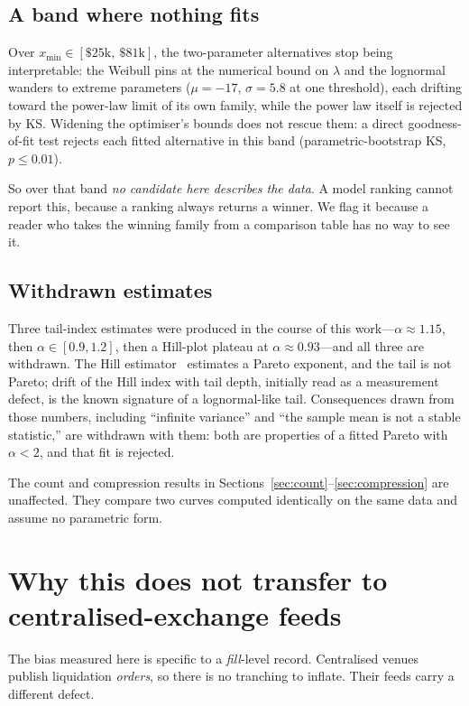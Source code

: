 \documentclass[11pt,a4paper]{article}
\begin{document}
\subsection{A band where nothing fits}

Over $x_{\min} \in [\$25\mathrm{k},\ \$81\mathrm{k}]$, the two-parameter alternatives stop
being interpretable: the Weibull pins at the numerical bound on $\lambda$ and the lognormal
wanders to extreme parameters ($\mu = -17$, $\sigma = 5.8$ at one threshold), each drifting
toward the power-law limit of its own family, while the power law itself is rejected by KS.
Widening the optimiser's bounds does not rescue them: a direct goodness-of-fit test rejects
each fitted alternative in this band (parametric-bootstrap KS, $p \le 0.01$).

So over that band \emph{no candidate here describes the data}. A model ranking cannot report
this, because a ranking always returns a winner. We flag it because a reader who takes the
winning family from a comparison table has no way to see it.

\subsection{Withdrawn estimates}

Three tail-index estimates were produced in the course of this work---$\alpha \approx 1.15$,
then $\alpha \in [0.9, 1.2]$, then a Hill-plot plateau at $\alpha \approx 0.93$---and all three
are withdrawn. The Hill estimator~\cite{hill1975} estimates a Pareto exponent, and the tail is not Pareto; drift
of the Hill index with tail depth, initially read as a measurement defect, is the known
signature of a lognormal-like tail. Consequences drawn from those numbers, including ``infinite
variance'' and ``the sample mean is not a stable statistic,'' are withdrawn with them: both are
properties of a fitted Pareto with $\alpha < 2$, and that fit is rejected.

The count and compression results in Sections~\ref{sec:count}--\ref{sec:compression} are
unaffected. They compare two curves computed identically on the same data and assume no
parametric form.

\section{Why this does not transfer to centralised-exchange feeds}
\label{sec:cex}

The bias measured here is specific to a \emph{fill}-level record. Centralised venues publish
liquidation \emph{orders}, so there is no tranching to inflate. Their feeds carry a different
defect.
\end{document}
